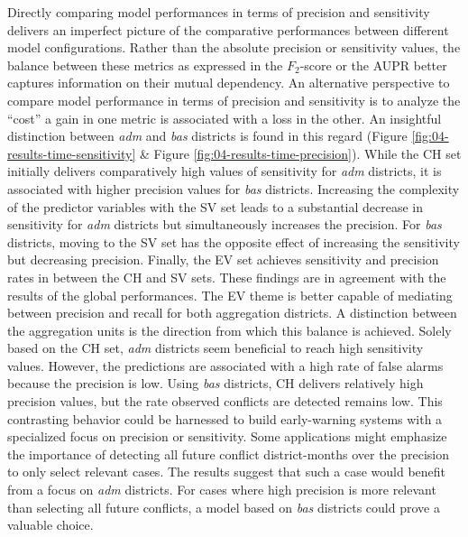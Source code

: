 \documentclass[a4paper,11pt]{article}
\begin{document}
Directly comparing model performances in terms of precision and sensitivity delivers
an imperfect picture of the comparative performances between different model configurations.
Rather than the absolute precision or sensitivity values, the balance between
these metrics as expressed in the \(F_2\)-score or the AUPR better captures
information on their mutual dependency. An alternative perspective to compare model
performance in terms of precision and sensitivity is to analyze the ``cost'' a
gain in one metric is associated with a loss in the other. An insightful
distinction between \emph{adm} and \emph{bas} districts is found in this regard
(Figure \ref{fig:04-results-time-sensitivity} \& Figure \ref{fig:04-results-time-precision}).
While the CH set initially delivers comparatively high values of sensitivity for
\emph{adm} districts, it is associated with higher precision values for \emph{bas}
districts. Increasing the complexity of the predictor variables with the SV set
leads to a substantial decrease in sensitivity for \emph{adm} districts but simultaneously
increases the precision. For \emph{bas} districts, moving to the SV set has the opposite
effect of increasing the sensitivity but decreasing precision. Finally, the EV
set achieves sensitivity and precision rates in between the CH and SV sets.
These findings are in agreement with the results of the global performances.
The EV theme is better capable of mediating between precision and recall for both aggregation
districts. A distinction between the aggregation units is the direction from which
this balance is achieved. Solely based on the CH set, \emph{adm} districts seem
beneficial to reach high sensitivity values. However, the predictions are associated
with a high rate of false alarms because the precision is low. Using \emph{bas} districts,
CH delivers relatively high precision values, but the rate observed conflicts are
detected remains low. This contrasting behavior could be harnessed to build
early-warning systems with a specialized focus on precision or sensitivity. Some
applications might emphasize the importance of detecting all future conflict
district-months over the precision to only select relevant cases. The results
suggest that such a case would benefit from a focus on \emph{adm} districts. For cases
where high precision is more relevant than selecting all future conflicts, a model
based on \emph{bas} districts could prove a valuable choice.

\newpage
\end{document}
